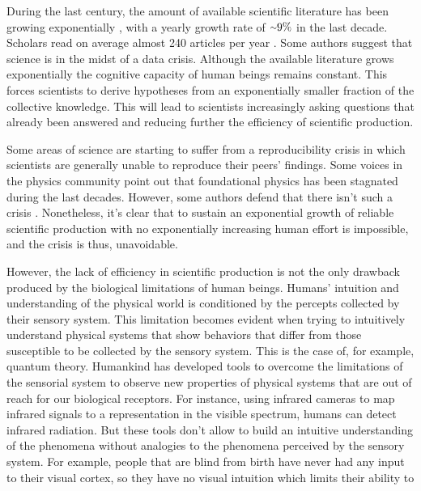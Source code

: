 \documentclass[11pt,a4paper,twoside]{report}
\newcommand{\+}{\textnormal{+} }
\theoremstyle{definition}
\numberwithin{equation}{chapter}
\begin{document}
During the last century, the amount of available scientific literature has been 
growing exponentially \cite{sinatra2015century,BornmannRudiger}, with a yearly
growth rate of $ {\raise.17ex\hbox{$\scriptstyle\mathtt{\sim}$}} 9\%$ in the 
last decade. Scholars read on average almost 240 articles per year
\cite{publications7010018}. Some authors \cite{Alkhateeb} suggest that science 
is in the midst of a data crisis. Although the available literature grows
exponentially the cognitive capacity of human beings remains constant. This
forces scientists to derive hypotheses from an exponentially smaller fraction of
the collective knowledge. This will lead to scientists increasingly asking
questions that already been answered and reducing further the efficiency of
scientific production. 

Some areas of science are starting to suffer from a reproducibility crisis 
\cite{Saltelli, begley2012raise} in which scientists are generally 
unable to reproduce their peers' findings. Some voices in the physics 
community \cite{Sabine} point out that foundational physics has been 
stagnated during the last decades. However, some authors defend that there isn't
such a crisis \cite{Fanelli2628}. Nonetheless, it's clear that to sustain an 
exponential growth of reliable scientific production with no exponentially 
increasing human effort is impossible, and the crisis is thus, unavoidable.
 \par
However, the lack of efficiency in scientific production is not the only 
drawback produced by the biological limitations of human beings. Humans' 
intuition and understanding of the physical world is conditioned by the
percepts collected by their sensory system. This limitation becomes evident when
trying to intuitively understand physical systems that show behaviors that differ
from those susceptible to be collected by the sensory system. This is the case 
of, for example, quantum theory. Humankind has developed tools to overcome 
the limitations of the sensorial system to observe new properties of 
physical systems that are out of reach for our biological receptors. For 
instance, using infrared cameras to map infrared signals to a representation 
in the visible spectrum, humans can detect infrared radiation. But these tools 
don't allow to build an intuitive understanding of the phenomena without 
analogies to the phenomena perceived by the sensory system. 
For example, people that are blind from birth have never had any input to their
visual cortex, so they have no visual intuition which limits their ability to 
\end{document}
